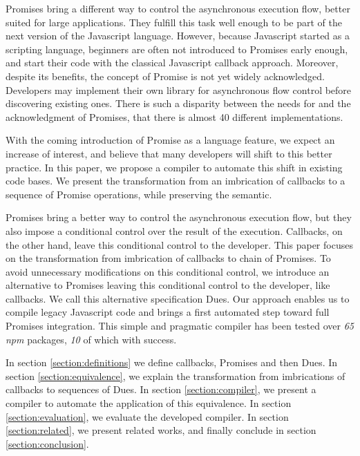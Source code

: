 Promises bring a different way to control the asynchronous execution flow, better suited for large applications.
They fulfill this task well enough to be part of the next version of the Javascript language.
However, because Javascript started as a scripting language, beginners are often not introduced to Promises early enough, and start their code with the classical Javascript callback approach.
Moreover, despite its benefits, the concept of Promise is not yet widely acknowledged.
Developers may implement their own library for asynchronous flow control before discovering existing ones.%
There is such a disparity between the needs for and the acknowledgment of Promises, that there is almost 40 different implementations.

With the coming introduction of Promise as a language feature, we expect an increase of interest, and believe that many developers will shift to this better practice.
In this paper, we propose a compiler to automate this shift in existing code bases.
We present the transformation from an imbrication of callbacks to a sequence of Promise operations, while preserving the semantic.

Promises bring a better way to control the asynchronous execution flow, but they also impose a conditional control over the result of the execution.
Callbacks, on the other hand, leave this conditional control to the developer.
This paper focuses on the transformation from imbrication of callbacks to chain of Promises.
To avoid unnecessary modifications on this conditional control, we introduce an alternative to Promises leaving this conditional control to the developer, like callbacks.
We call this alternative specification Dues.
Our approach enables us to compile legacy Javascript code and brings a first automated step toward full Promises integration.
This simple and pragmatic compiler has been tested over \textit{65} \textit{npm} packages, \textit{10} of which with success.

In section \ref{section:definitions} we define callbacks, Promises and then Dues.
In section \ref{section:equivalence}, we explain the transformation from imbrications of callbacks to sequences of Dues.
In section \ref{section:compiler}, we present a compiler to automate the application of this equivalence.
In section \ref{section:evaluation}, we evaluate the developed compiler.
In section \ref{section:related}, we present related works, and finally conclude in section \ref{section:conclusion}.